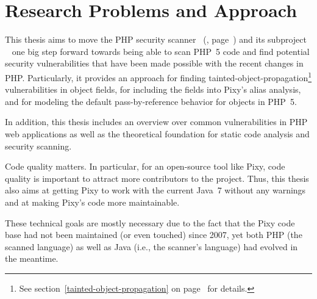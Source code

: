\section{Research Problems and Approach}

This thesis aims to move the PHP security scanner ~(\cite{pixy}, page~\pageref{pixy}) and its subproject ~\cite{phpparser} one big step forward towards being able to scan PHP~5 code and find potential security vulnerabilities that have been made possible with the recent changes in PHP. Particularly, it provides an approach for finding tainted-object-propagation\footnote{See section~\ref{tainted-object-propagation} on page~\pageref{tainted-object-propagation} for details.} vulnerabilities in object fields, for including the fields into Pixy's alias analysis, and for modeling the default pass-by-reference behavior for objects in PHP~5.

In addition, this thesis includes an overview over common vulnerabilities in PHP web applications as well as the theoretical foundation for static code analysis and security scanning.

Code quality matters. In particular, for an open-source tool like Pixy, code quality is important to attract more contributors to the project. Thus, this thesis also aims at getting Pixy to work with the current Java~7 without any warnings and at making Pixy's code more maintainable.

These technical goals are mostly necessary due to the fact that the Pixy code base had not been maintained (or even touched) since 2007, yet both PHP (\ie the scanned language) as well as Java (i.e., the scanner's language) had evolved in the meantime.
